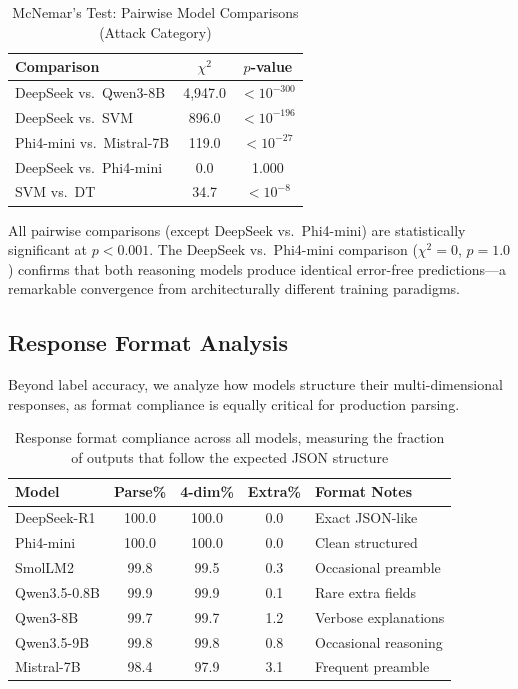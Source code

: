 \documentclass[journal]{IEEEtran}
\begin{document}
\begin{table}[!ht]
\centering
\caption{McNemar's Test: Pairwise Model Comparisons (Attack Category)}
\label{tab:mcnemar}
\begin{tabular}{lcc}
\toprule
\textbf{Comparison} & \textbf{$\chi^2$} & \textbf{$p$-value} \\
\midrule
DeepSeek vs.\ Qwen3-8B & 4,947.0 & $<10^{-300}$ \\
DeepSeek vs.\ SVM & 896.0 & $<10^{-196}$ \\
Phi4-mini vs.\ Mistral-7B & 119.0 & $<10^{-27}$ \\
DeepSeek vs.\ Phi4-mini & 0.0 & 1.000 \\
SVM vs.\ DT & 34.7 & $<10^{-8}$ \\
\bottomrule
\end{tabular}
\end{table}

All pairwise comparisons (except DeepSeek vs.\ Phi4-mini) are statistically significant at $p < 0.001$. The DeepSeek vs.\ Phi4-mini comparison ($\chi^2=0$, $p=1.0$) confirms that both reasoning models produce identical error-free predictions---a remarkable convergence from architecturally different training paradigms.

\subsection{Response Format Analysis}

Beyond label accuracy, we analyze how models structure their multi-dimensional responses, as format compliance is equally critical for production parsing.

\begin{table}[!ht]
\centering
\caption{Response format compliance across all models, measuring the fraction of outputs that follow the expected JSON structure}
\label{tab:format}
\begin{tabular}{lcccl}
\toprule
\textbf{Model} & \textbf{Parse\%} & \textbf{4-dim\%} & \textbf{Extra\%} & \textbf{Format Notes} \\
\midrule
DeepSeek-R1 & 100.0 & 100.0 & 0.0 & Exact JSON-like \\
Phi4-mini & 100.0 & 100.0 & 0.0 & Clean structured \\
SmolLM2 & 99.8 & 99.5 & 0.3 & Occasional preamble \\
Qwen3.5-0.8B & 99.9 & 99.9 & 0.1 & Rare extra fields \\
Qwen3-8B & 99.7 & 99.7 & 1.2 & Verbose explanations \\
Qwen3.5-9B & 99.8 & 99.8 & 0.8 & Occasional reasoning \\
Mistral-7B & 98.4 & 97.9 & 3.1 & Frequent preamble \\
\bottomrule
\end{tabular}
\end{table}
\end{document}
